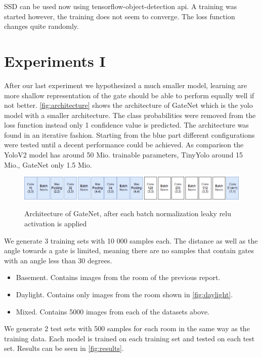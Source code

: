 \documentclass{article}
\begin{document}
SSD can be used now using tensorflow-object-detection api. A training was started however, the training does not seem to converge. The loss function changes quite randomly.

\section{Experiments I}

After our last experiment we hypothesized a much smaller model, learning are more shallow representation of the gate should be able to perform equally well if not better. \autoref{fig:architecture} shows the architecture of GateNet which is the yolo model with a smaller architecture. The class probabilities were removed from the loss function instead only 1 confidence value is predicted. The architecture was found in an iterative fashion. Starting from the blue part different configurations were tested until a decent performance could be achieved. As comparison the YoloV2 model has around 50 Mio. trainable parameters, TinyYolo around 15 Mio., GateNet only 1.5 Mio.

\begin{figure}
	\centering
	\includegraphics[width=0.9\linewidth]{fig/architecture}
	\label{fig:architecture}
	\caption{Architecture of GateNet, after each batch normalization leaky relu activation is applied}
\end{figure}

We generate 3 training sets with 10 000 samples each. The distance as well as the angle towards a gate is limited, meaning there are no samples that contain gates with an angle less than 30 degrees.
\begin{itemize}
	\item Basement. Contains images from the room of the previous report.
	\item Daylight. Contains only images from the room shown in \autoref{fig:daylight}.
	\item Mixed. Contains 5000 images from each of the datasets above. 
\end{itemize}

We generate 2 test sets with 500 samples for each room in the same way as the training data. Each model is trained on each training set and tested on each test set. Results can be seen in \autoref{fig:results}.
\end{document}
